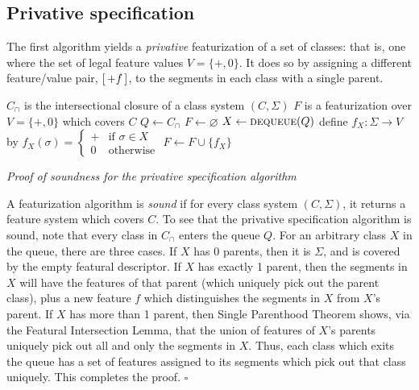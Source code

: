 \documentclass[12pt, oneside]{article}   	%
\newcommand{\featmat}[1]
{$\begin{bsmallmatrix*}[l]\text{\normalsize #1}\end{bsmallmatrix*}$}
\begin{document}
\subsection{Privative specification}

The first algorithm yields a \textit{privative} featurization of a set of classes: that is, one where the set of legal feature values $V = \{+, 0\}$. It does so by assigning a different feature/value pair, \featmat{$+f$}, to the segments in each class with a single parent.

\noindent \begin{algorithmic}
	\singlespacing
    \REQUIRE $C_\cap$ is the intersectional closure of a class system $(C, \Sigma)$
    \ENSURE $F$ is a featurization over $V = \{ +, 0 \}$ which covers $C$
    \STATE
    \STATE $Q \leftarrow C_\cap$
    \STATE $F \leftarrow \varnothing$
    \STATE
        \STATE $X \leftarrow \textsc{dequeue}(Q)$
            \STATE define $f_X : \Sigma \rightarrow V$ by $f_X(\sigma) = \begin{cases}
                + & \mbox{if } \sigma \in X \\
                0 & \mbox{otherwise}
                \end{cases} $
            \STATE $F \leftarrow F \cup \{f_X\}$
        \ENDIF
    \ENDWHILE
\end{algorithmic}
\doublespacing

\noindent \textit{Proof of soundness for the privative specification algorithm}

A featurization algorithm is \textit{sound} if for every class system $(C, \Sigma)$, it returns a feature system which covers $C$. To see that the privative specification algorithm is sound, note that every class in $C_\cap$ enters the queue $Q$. For an arbitrary class $X$ in the queue, there are three cases. If $X$ has 0 parents, then it is $\Sigma$, and is covered by the empty featural descriptor. If $X$ has exactly 1 parent, then the segments in $X$ will have the features of that parent (which uniquely pick out the parent class), plus a new feature $f$ which distinguishes the segments in $X$ from $X$'s parent. If $X$ has more than 1 parent, then Single Parenthood Theorem shows, via the Featural Intersection Lemma, that the union of features of $X$'s parents uniquely pick out all and only the segments in $X$. Thus, each class which exits the queue has a set of features assigned to its segments which pick out that class uniquely. This completes the proof. $\square$
\end{document}
